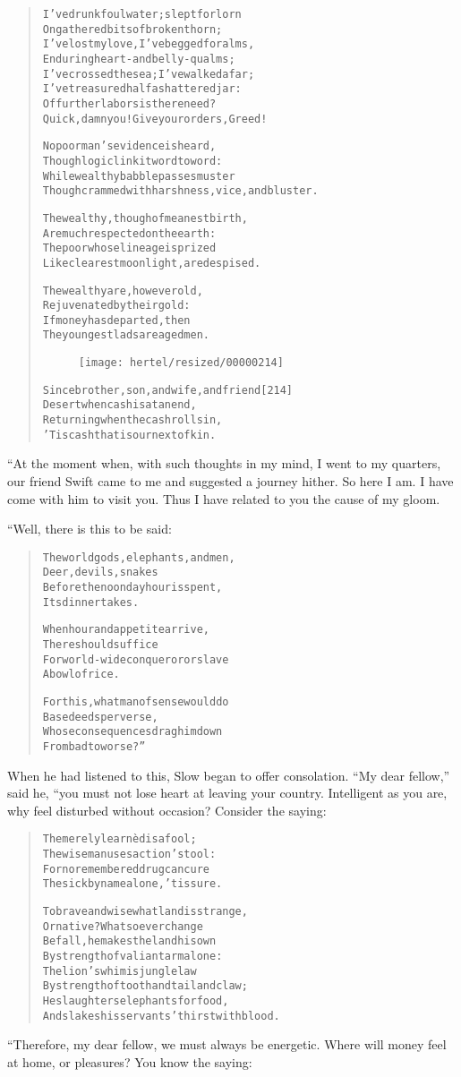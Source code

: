 \documentclass[article, twoside, 10pt]{memoir}
\renewenvironment{verbatim}{%
\begin{quote}%
\vskip -10pt%
\begin{alltt}\normalfont\small}{\end{alltt}%
\end{quote}%
\vskip -10pt
} %
\begin{document}
\begin{verbatim}
I've drunk foul water; slept forlorn
On gathered bits of broken thorn;
I've lost my love, I've begged for alms,
Enduring heart- and belly-qualms;
I've crossed the sea; I've walked afar;
I've treasured half a shattered jar:
Of further labors is there need?
Quick, damn you! Give your orders, Greed!

No poor man's evidence is heard,
Though logic link it word to word:
While wealthy babble passes muster
Though crammed with harshness, vice, and bluster.

The wealthy, though of meanest birth,
Are much respected on the earth:
The poor whose lineage is prized
Like clearest moonlight, are despised.

The wealthy are, however old,
Rejuvenated by their gold:
If money has departed, then
The youngest lads are aged men.

\begin{figure}[p]\texttt{[image: hertel/resized/00000214]}\end{figure}Since brother, son, and wife, and friend                [214]
Desert when cash is at an end,
Returning when the cash rolls in,
'Tis cash that is our next of kin.
\end{verbatim}
“At the moment when, with such thoughts in my mind, I went to my
quarters, our friend Swift came to me and suggested a journey
hither. So here I am. I have come with him to visit you. Thus I
have related to you the cause of my gloom.

“Well, there is this to be said:

\begin{verbatim}
The world{\textemdash}gods, elephants, and men,
    Deer, devils, snakes{\textemdash}
Before the noonday hour is spent,
    Its dinner takes.

When hour and appetite arrive,
    There should suffice
For world-wide conqueror or slave
    A bowl of rice.

For this, what man of sense would do
    Base deeds perverse,
Whose consequences drag him down
    From bad to worse?”
\end{verbatim}
When he had listened to this, Slow began to offer consolation.
``My dear fellow,'' said he, “you must not lose heart at leaving
your country. Intelligent as you are, why feel disturbed without
occasion? Consider the saying:

\begin{verbatim}
The merely learnèd is a fool;
The wise man uses action's tool:
For no remembered drug can cure
The sick by name alone, 'tis sure.

To brave and wise what land is strange,
Or native? Whatsoever change
Befall, he makes the land his own
By strength of valiant arm alone:
The lion's whim is jungle law
By strength of tooth and tail and claw;
He slaughters elephants for food,
And slakes his servants' thirst with blood.
\end{verbatim}
“Therefore, my dear fellow, we must always be energetic. Where will
money feel at home, or pleasures? You know the saying:
\end{document}
